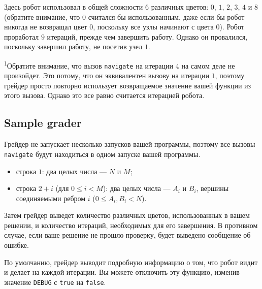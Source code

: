 \documentclass[12pt]{article}
\begin{document}
Здесь робот использовал в общей сложности $6$ различных цветов: $0$, $1$, $2$, $3$, $4$ и $8$ (обратите внимание, что $0$ считался бы использованным, даже если бы робот никогда не возвращал цвет $0$, поскольку все узлы начинают с цвета $0$). Робот проработал $9$ итераций, прежде чем завершить работу. Однако он провалился, поскольку завершил работу, не посетив узел $1$.

\textsuperscript{1}Обратите внимание, что вызов \texttt{navigate} на итерации $4$ на самом деле не произойдет. Это потому, что он эквивалентен вызову на итерации $1$, поэтому грейдер просто повторно использует возвращаемое значение вашей функции из этого вызова. Однако это все равно считается итерацией робота.

\subsection{Sample grader}

Грейдер не запускает несколько запусков вашей программы, поэтому все вызовы \texttt{navigate} будут находиться в одном запуске вашей программы.
\begin{itemize}
\item строка $1$: два целых числа — $N$ и $M$; 
\item строка $2+i$ (для $0 \leq i < M$): два целых числа — $A_i$ и $B_i$, вершины соединяемыми ребром $i$ ($0 \leq A_i, B_i < N$). 
\end{itemize}

Затем грейдер выведет количество различных цветов, использованных в вашем решении, и количество итераций, необходимых для его завершения. В противном случае, если ваше решение не прошло проверку, будет выведено сообщение об ошибке.

По умолчанию, грейдер выводит подробную информацию о том, что робот видит и делает на каждой итерации. Вы можете отключить эту функцию, изменив значение \texttt{DEBUG} с \texttt{true} на \texttt{false}.
\end{document}

